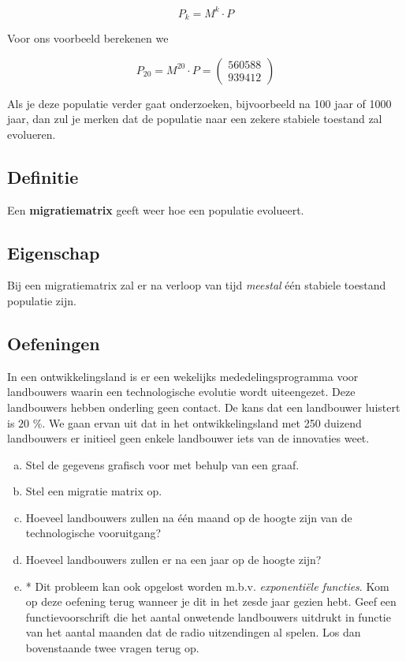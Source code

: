 \documentclass[12pt,twoside]{article}
\begin{document}
$$ P_k = M^k \cdot P $$

Voor ons voorbeeld berekenen we

\[P_{20} = M^{20} \cdot P = \begin{pmatrix}560588\\939412\end{pmatrix}\]

Als je deze populatie verder gaat onderzoeken, bijvoorbeeld na 100 jaar of 1000 jaar, dan zul je merken dat de populatie naar een zekere stabiele toestand zal evolueren.

\subsection{Definitie}

Een {\bf migratiematrix} geeft weer hoe een populatie evolueert.

\subsection{Eigenschap}

Bij een migratiematrix zal er na verloop van tijd {\em meestal} één stabiele toestand populatie zijn.

\subsection{Oefeningen}


\begin{oefening}
In een ontwikkelingsland is er een wekelijks mededelingsprogramma voor landbouwers waarin een technologische evolutie wordt uiteengezet. Deze landbouwers hebben onderling geen contact. De kans dat een landbouwer luistert is $20$ \%. We gaan ervan uit dat in het ontwikkelingsland met 250 duizend landbouwers er initieel geen enkele landbouwer iets van de innovaties weet.

\begin{enumerate}[(a)]
  \item Stel de gegevens grafisch voor met behulp van een graaf.
  \item Stel een migratie matrix op.
  \item Hoeveel landbouwers zullen na één maand op de hoogte zijn van de technologische vooruitgang?
  \item Hoeveel landbouwers zullen er na een jaar op de hoogte zijn?
  \item * Dit probleem kan ook opgelost worden m.b.v. {\em exponentiële functies}. Kom op deze oefening terug wanneer je dit in het zesde jaar gezien hebt. Geef een functievoorschrift die het aantal onwetende landbouwers uitdrukt in functie van het aantal maanden dat de radio uitzendingen al spelen. Los dan bovenstaande twee vragen terug op.
\end{enumerate}
\end{oefening}
\end{document}
